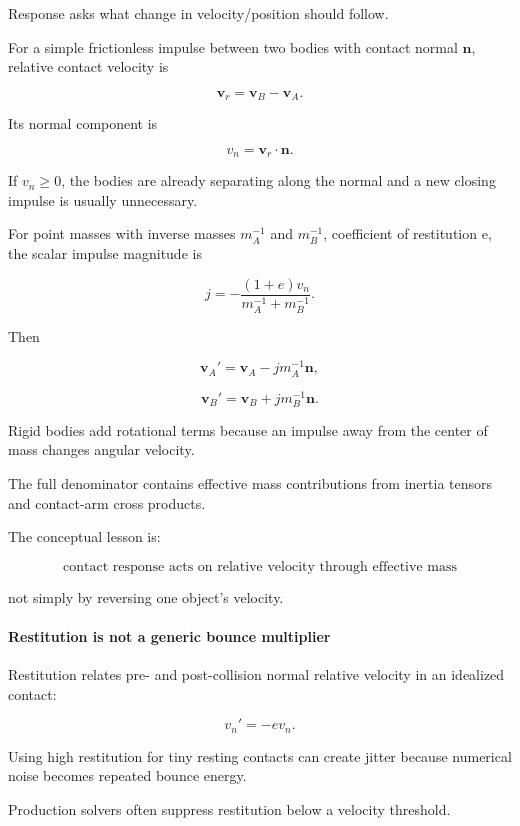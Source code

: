 Response asks what change in velocity/position should follow.

For a simple frictionless impulse between two bodies with contact normal \(\mathbf n\), relative contact velocity is

\[
\mathbf v_r
=
\mathbf v_B-\mathbf v_A.
\]

Its normal component is

\[
v_n=\mathbf v_r\cdot\mathbf n.
\]

If \(v_n\ge0\), the bodies are already separating along the normal and a new closing impulse is usually unnecessary.

For point masses with inverse masses \(m_A^{-1}\) and \(m_B^{-1}\), coefficient of restitution e, the scalar impulse magnitude is

\[
j
=
-\frac{(1+e)v_n}
{m_A^{-1}+m_B^{-1}}.
\]

Then

\[
\mathbf v_A'
=
\mathbf v_A
-
j m_A^{-1}\mathbf n,
\]

\[
\mathbf v_B'
=
\mathbf v_B
+
j m_B^{-1}\mathbf n.
\]

Rigid bodies add rotational terms because an impulse away from the center of mass changes angular velocity.

The full denominator contains effective mass contributions from inertia tensors and contact-arm cross products.

The conceptual lesson is:

\[
\boxed{
\text{contact response acts on relative velocity through effective mass}
}
\]

not simply by reversing one object's velocity.

\paragraph{Restitution is not a generic bounce multiplier}\label{03-visual-computing-i-ch001-restitution-is-not-a-generic-bounce-multiplier}

\hypertarget{03-visual-computing-i-ch001-restitution-is-not-a-generic-bounce-multiplier}{}

Restitution relates pre- and post-collision normal relative velocity in an idealized contact:

\[
v_n'
=
-e v_n.
\]

Using high restitution for tiny resting contacts can create jitter because numerical noise becomes repeated bounce energy.

Production solvers often suppress restitution below a velocity threshold.

